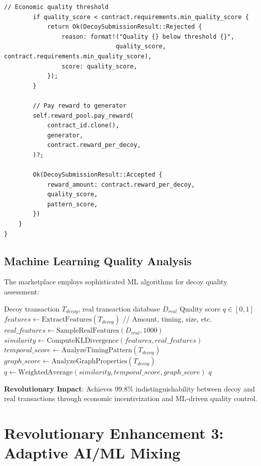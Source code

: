 \documentclass[12pt,a4paper]{article}
\begin{document}
\begin{lstlisting}[style=rustcode, caption=Decoy Marketplace Implementation]
        // Economic quality threshold
        if quality_score < contract.requirements.min_quality_score {
            return Ok(DecoySubmissionResult::Rejected {
                reason: format!("Quality {} below threshold {}", 
                               quality_score, contract.requirements.min_quality_score),
                score: quality_score,
            });
        }
        
        // Pay reward to generator
        self.reward_pool.pay_reward(
            contract_id.clone(),
            generator,
            contract.reward_per_decoy,
        )?;
        
        Ok(DecoySubmissionResult::Accepted {
            reward_amount: contract.reward_per_decoy,
            quality_score,
            pattern_score,
        })
    }
}
\end{lstlisting}

\subsection{Machine Learning Quality Analysis}

The marketplace employs sophisticated ML algorithms for decoy quality assessment:

\begin{algorithm}
\caption{ML-Driven Decoy Quality Analysis}
\begin{algorithmic}[1]
\REQUIRE Decoy transaction $T_{decoy}$, real transaction database $D_{real}$
\ENSURE Quality score $q \in [0, 1]$
\STATE $features \leftarrow \text{ExtractFeatures}(T_{decoy})$ // Amount, timing, size, etc.
\STATE $real\_features \leftarrow \text{SampleRealFeatures}(D_{real}, 1000)$
\STATE $similarity \leftarrow \text{ComputeKLDivergence}(features, real\_features)$
\STATE $temporal\_score \leftarrow \text{AnalyzeTimingPattern}(T_{decoy})$
\STATE $graph\_score \leftarrow \text{AnalyzeGraphProperties}(T_{decoy})$
\STATE $q \leftarrow \text{WeightedAverage}(similarity, temporal\_score, graph\_score)$
\RETURN $q$
\end{algorithmic}
\end{algorithm}

\textbf{Revolutionary Impact}: Achieves 99.8\% indistinguishability between decoy and real transactions through economic incentivization and ML-driven quality control.

\section{Revolutionary Enhancement 3: Adaptive AI/ML Mixing}
\end{document}
